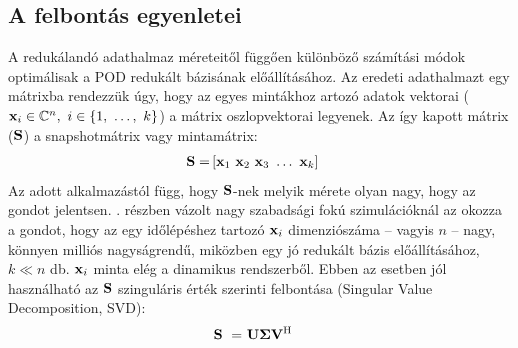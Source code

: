         \subsection{A felbontás egyenletei}
            A redukálandó adathalmaz méreteitől függően különböző számítási módok optimálisak a POD redukált bázisának előállításához. Az eredeti adathalmazt egy mátrixba rendezzük úgy, hogy az egyes mintákhoz artozó adatok vektorai (${\bf x}_i \in \mathbb{C}^n,~i \in \{1,~\hdots,~k\}$) a mátrix oszlopvektorai legyenek. Az így kapott mátrix (${\bf S}$) a snapshotmátrix vagy mintamátrix:
            \begin{align}
                {\bf S} = & \left[ {\bf x}_1~{\bf x}_2~{\bf x}_3~\hdots~{\bf x}_k \right]
            \end{align}
            Az adott alkalmazástól függ, hogy ${\bf S}$-nek melyik mérete olyan nagy, hogy az gondot jelentsen. . részben vázolt nagy szabadsági fokú szimulációknál az okozza a gondot, hogy az egy időlépéshez tartozó ${\bf x}_i$ dimenziószáma -- vagyis $n$ -- nagy, könnyen milliós nagyságrendű, miközben egy jó redukált bázis előállításához, $k \ll n$ db. ${\bf x}_i$ minta elég a dinamikus rendszerből. Ebben az esetben jól használható az ${\bf S}$ szinguláris érték szerinti felbontása (Singular Value Decomposition, SVD):
            \begin{align}
                \label{equ:svd}
                {\bf S}~=&~{\bf U \Sigma V^{\mathrm{H}}}
            \end{align}
